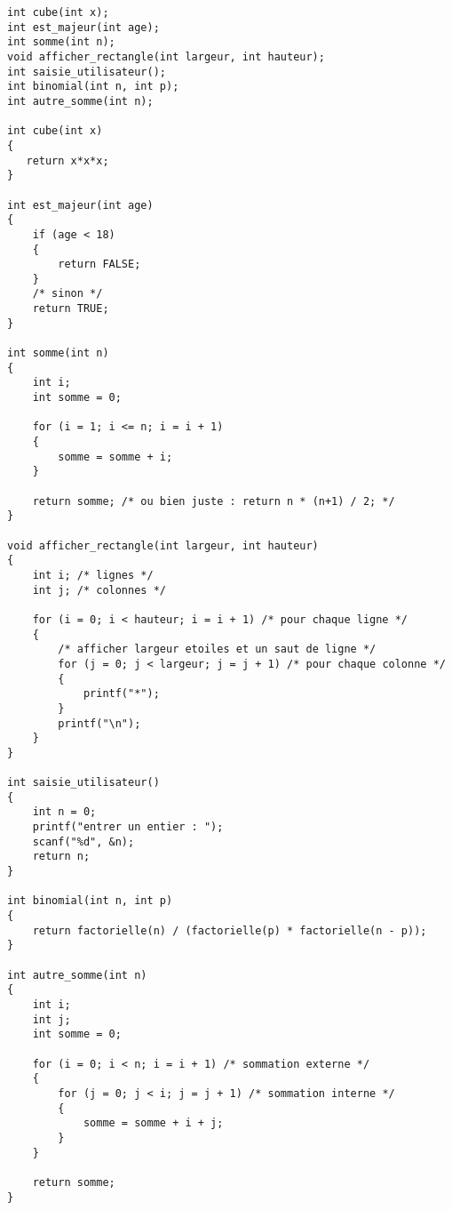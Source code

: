 \begin{correction}
\begin{verbatim}
int cube(int x);
int est_majeur(int age);
int somme(int n);
void afficher_rectangle(int largeur, int hauteur);
int saisie_utilisateur();
int binomial(int n, int p);
int autre_somme(int n);

int cube(int x)
{
   return x*x*x;
}

int est_majeur(int age)
{
    if (age < 18)
    {
        return FALSE;
    }
    /* sinon */
    return TRUE;
}

int somme(int n)
{
    int i;
    int somme = 0;

    for (i = 1; i <= n; i = i + 1)
    {
        somme = somme + i;
    }

    return somme; /* ou bien juste : return n * (n+1) / 2; */
}

void afficher_rectangle(int largeur, int hauteur)
{
    int i; /* lignes */
    int j; /* colonnes */

    for (i = 0; i < hauteur; i = i + 1) /* pour chaque ligne */
    {
        /* afficher largeur etoiles et un saut de ligne */
        for (j = 0; j < largeur; j = j + 1) /* pour chaque colonne */
        {
            printf("*");
        }
        printf("\n");
    }
}

int saisie_utilisateur()
{
    int n = 0;
    printf("entrer un entier : ");
    scanf("%d", &n);
    return n;
}

int binomial(int n, int p)
{
    return factorielle(n) / (factorielle(p) * factorielle(n - p));
}

int autre_somme(int n)
{
    int i;
    int j;
    int somme = 0;

    for (i = 0; i < n; i = i + 1) /* sommation externe */
    {
        for (j = 0; j < i; j = j + 1) /* sommation interne */
        {
            somme = somme + i + j;
        }    
    }

    return somme;  
}
\end{verbatim}
\end{correction}

